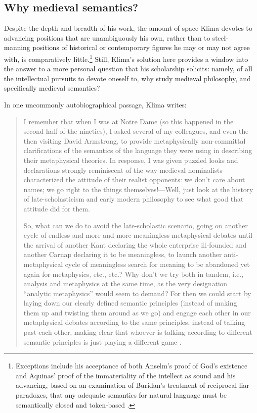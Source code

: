 \documentclass[]{article}
\begin{document}
\subsection{Why medieval semantics?}
Despite the depth and breadth of his work, 
the amount of space Klima devotes to advancing positions that are unambiguously his own, 
rather than to steel-manning positions of historical or contemporary figures 
he may or may not agree with,
is comparatively little.\footnote{Exceptions include his acceptance of both Anselm's proof of God's existence and Aquinas' proof of the immateriality of the intellect as sound \autocite{Klima2000,Klima2009a} 
	and his advancing, 
	based on an examination of Buridan's treatment of reciprocal liar paradoxes, 
	that any adequate semantics for natural language must be semantically closed and token-based \autocite{Klima2004,Klima2008}.} 
Still, 
Klima's solution here provides a window into the answer to a more personal question that his scholarship solicits: 
namely, 
of all the intellectual pursuits to devote oneself to, 
why study medieval philosophy, 
and specifically medieval semantics?

In one uncommonly autobiographical passage, Klima writes: 
\begin{quote}
I remember that when I was at Notre Dame (so this happened in the second
half of the nineties), I asked several of my colleagues, and even the then
visiting David Armstrong, to provide metaphysically non-committal
clarifications of the semantics of the language they were using in
describing their metaphysical theories. In response, I was given puzzled
looks and declarations strongly reminiscent of the way medieval
nominalists characterized the attitude of their realist opponents: we don’t
care about names; we go right to the things themselves!—Well, just look 
at the history of late-scholasticism and early modern philosophy to see
what good that attitude did for them.

So, what can we do to avoid the late-scholastic scenario, going on another
cycle of endless and more and more meaningless metaphysical debates
until the arrival of another Kant declaring the whole enterprise ill-founded
and another Carnap declaring it to be meaningless, to launch another anti-
metaphysical cycle of meaningless search for meaning to be abandoned
yet again for metaphysics, etc., etc.? Why don’t we try both in tandem,
i.e., analysis and metaphysics at the same time, as the very designation
“analytic metaphysics” would seem to demand? For then we could start by
laying down our clearly defined semantic principles (instead of making
them up and twisting them around as we go) and engage each other in our
metaphysical debates according to the same principles, instead of talking
past each other, making clear that whoever is talking according to different
semantic principles is just playing a different game \autocite[86-87]{Klima2014}.
\end{quote}
\end{document}
